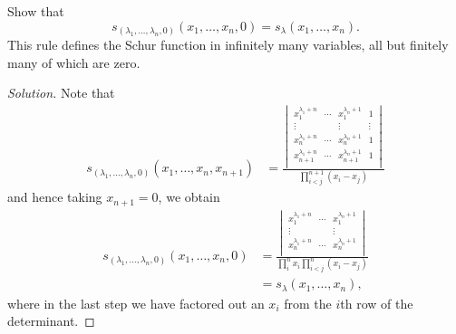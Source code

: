 \documentclass{../../mathnotes}
\begin{document}
\begin{exc}
    Show that
    \[s_{(\lambda_1,\ldots,\lambda_n,0)}(x_1,\ldots,x_n,0)=s_\lambda(x_1,\ldots,x_n).\]
    This rule defines the Schur function in infinitely many variables, all but finitely many
    of which are zero.
\end{exc}
\begin{proof}[Solution]
    Note that
    \begin{align*}
        s_{(\lambda_1,\ldots,\lambda_n,0)}(x_1,\ldots,x_n,x_{n+1}) &=
        \frac{
        \begin{vmatrix}
            x_1^{\lambda_1+n} & \cdots & x_1^{\lambda_n+1} & 1\\
            \vdots & &\vdots & \vdots\\
            x_n^{\lambda_1+n} & \cdots & x_n^{\lambda_n+1} & 1\\
            x_{n+1}^{\lambda_1+n} & \cdots & x_{n+1}^{\lambda_n+1} & 1\\
        \end{vmatrix}
        }{\prod_{i<j}^{n+1}(x_i-x_j)}
    \end{align*}
    and hence taking $x_{n+1}=0$, we obtain  
    \begin{align*}
        s_{(\lambda_1,\ldots,\lambda_n,0)}(x_1,\ldots,x_n,0) &= 
        \frac{
        \begin{vmatrix}
            x_1^{\lambda_1+n} & \cdots & x_1^{\lambda_n+1}\\
            \vdots & &\vdots\\
            x_n^{\lambda_1+n} & \cdots & x_n^{\lambda_n+1}\\
        \end{vmatrix}
    }{\prod_{i}^nx_i \prod_{i<j}^{n}(x_i-x_j)}\\
    &=s_\lambda(x_1,\ldots,x_n),
    \end{align*}
    where in the last step we have factored out an $x_i$ from the $i$th row of the determinant.
\end{proof}
\end{document}
